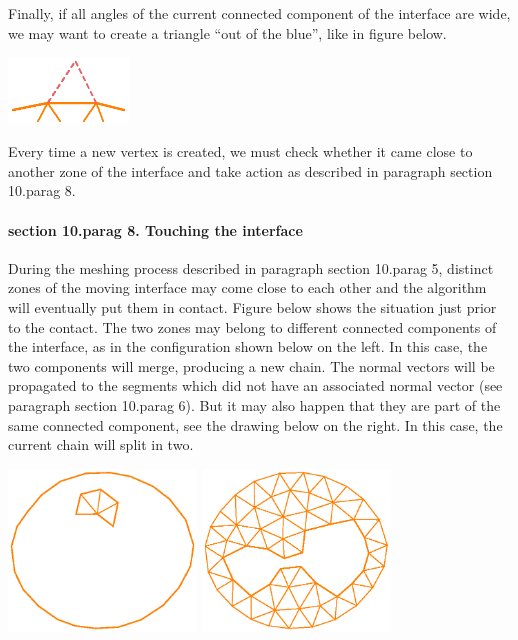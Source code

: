 Finally, if all angles of the current connected component of the interface are wide,
we may want to create a triangle ``out of the blue'', like in figure below.

\centerline{\includegraphics[width=32mm]{fill-blue.eps}}

Every time a new vertex is created, we must check whether it came close to another
zone of the interface and take action as described in paragraph \numb section 10.\numb parag 8.


\paragraph{\numb section 10.\numb parag 8. Touching the interface}

During the meshing process described in paragraph \numb section 10.\numb parag 5,
distinct zones of the moving interface may
come close to each other and the algorithm will eventually put them in contact.
Figure below shows the situation just prior to the contact.
The two zones may belong to different connected components of the interface,
as in the configuration shown below on the left.
In this case, the two components will merge, producing a new chain.
The normal vectors will be propagated to the segments which did not have an associated
normal vector (see paragraph \numb section 10.\numb parag 6).
But it may also happen that they are part of the same connected component,
see the drawing below on the right.
In this case, the current chain will split in two.

\centerline{\includegraphics[width=5cm]{touching-interf-1.eps}
\hskip5mm \includegraphics[width=5cm]{touching-interf-2.eps}}

